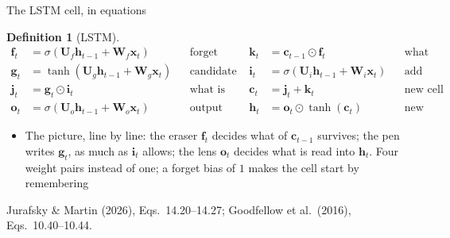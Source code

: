 \documentclass[aspectratio=169, 11pt]{beamer}
\newtheorem{defx}[theorem]{Definition}
\newcommand{\srcline}[1]{%
  \par\vspace{0.25em}%
  {\scriptsize\color{mcMuted}\hfill #1\par}}
\newcommand{\src}[3]{}      %
\begin{document}
\begin{frame}{The LSTM cell, in equations}
  \src{jurafsky_slp3}{equation}{14.20-14.27}
  \src{jurafsky_slp3}{section}{14.5}
  \src{goodfellow2016}{equation}{10.40-10.44}
  \src{jozefowicz2015}{section}{2.2}
  \vspace{-0.3em}
  \begin{defx}[LSTM]\label{th:lstm}
    \small
    \[
      \begin{aligned}
        \mathbf{f}_t &= \sigma(\mathbf{U}_f\mathbf{h}_{t-1} + \mathbf{W}_f\mathbf{x}_t) &&\text{forget gate} \qquad
        &\mathbf{k}_t &= \mathbf{c}_{t-1} \odot \mathbf{f}_t &&\text{what survives}\\
        \mathbf{g}_t &= \tanh(\mathbf{U}_g\mathbf{h}_{t-1} + \mathbf{W}_g\mathbf{x}_t) &&\text{candidate}
        &\mathbf{i}_t &= \sigma(\mathbf{U}_i\mathbf{h}_{t-1} + \mathbf{W}_i\mathbf{x}_t) &&\text{add gate}\\
        \mathbf{j}_t &= \mathbf{g}_t \odot \mathbf{i}_t &&\text{what is added}
        &\mathbf{c}_t &= \mathbf{j}_t + \mathbf{k}_t &&\text{new cell}\\
        \mathbf{o}_t &= \sigma(\mathbf{U}_o\mathbf{h}_{t-1} + \mathbf{W}_o\mathbf{x}_t) &&\text{output gate}
        &\mathbf{h}_t &= \mathbf{o}_t \odot \tanh(\mathbf{c}_t) &&\text{new hidden}
      \end{aligned}
    \]
  \end{defx}
  \vspace{-0.15em}
  {\footnotesize
  \begin{itemize}\itemsep0.12em
    \item The picture, line by line: the eraser $\mathbf{f}_t$ decides what
          of $\mathbf{c}_{t-1}$ survives; the pen writes $\mathbf{g}_t$, as much as
          $\mathbf{i}_t$ allows; the lens $\mathbf{o}_t$ decides what is read into
          $\mathbf{h}_t$. Four weight pairs instead of one; a forget bias of
          $1$ makes the cell start by remembering
  \end{itemize}}
  \vspace{-0.3em}
  \srcline{Jurafsky \& Martin (2026), Eqs.~14.20--14.27; Goodfellow et al.\ (2016), Eqs.~10.40--10.44.}
\end{frame}
\end{document}
